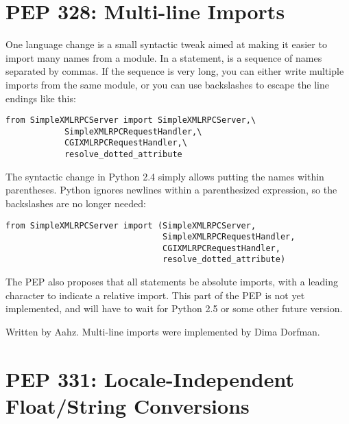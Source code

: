\documentclass{howto}
\begin{document}
\section{PEP 328: Multi-line Imports}

One language change is a small syntactic tweak aimed at making it
easier to import many names from a module.  In a
 statement, 
 is a sequence of names separated by commas.  If the sequence is 
very long, you can either write multiple imports from the same module,
or you can use backslashes to escape the line endings like this:

\begin{verbatim}
from SimpleXMLRPCServer import SimpleXMLRPCServer,\
            SimpleXMLRPCRequestHandler,\
            CGIXMLRPCRequestHandler,\
            resolve_dotted_attribute
\end{verbatim}

The syntactic change in Python 2.4 simply allows putting the names
within parentheses.  Python ignores newlines within a parenthesized
expression, so the backslashes are no longer needed:

\begin{verbatim}
from SimpleXMLRPCServer import (SimpleXMLRPCServer,
                                SimpleXMLRPCRequestHandler,
                                CGIXMLRPCRequestHandler,
                                resolve_dotted_attribute)
\end{verbatim}

The PEP also proposes that all \keyword{import} statements be absolute
imports, with a leading  character to indicate a relative
import.  This part of the PEP is not yet implemented, and will have to
wait for Python 2.5 or some other future version.

\begin{seealso}
            {Written by Aahz.  Multi-line imports were implemented by
             Dima Dorfman.}
\end{seealso}


\section{PEP 331: Locale-Independent Float/String Conversions}
\end{document}
